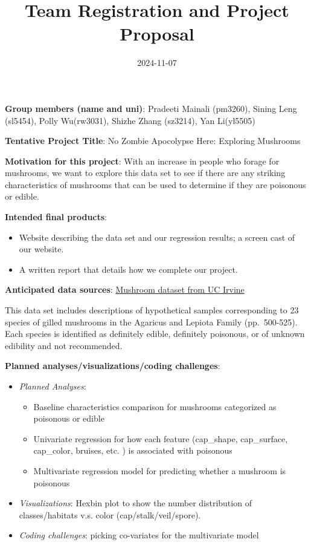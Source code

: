 \documentclass[
]{article}
\title{Team Registration and Project Proposal}
\author{}
\date{\vspace{-2.5em}2024-11-07}
\providecommand{\tightlist}{%
  \setlength{\itemsep}{0pt}\setlength{\parskip}{0pt}}
\begin{document}
\maketitle

\textbf{Group members (name and uni)}: Pradeeti Mainali (pm3260), Sining
Leng (sl5454), Polly Wu(rw3031), Shizhe Zhang (sz3214), Yan Li(yl5505)

\textbf{Tentative Project Title}: No Zombie Apocolypse Here: Exploring
Mushrooms

\textbf{Motivation for this project}: With an increase in people who
forage for mushrooms, we want to explore this data set to see if there
are any striking characteristics of mushrooms that can be used to
determine if they are poisonous or edible.

\textbf{Intended final products}:

\begin{itemize}
\tightlist
\item
  Website describing the data set and our regression results; a screen
  cast of our website.
\item
  A written report that details how we complete our project.
\end{itemize}

\textbf{Anticipated data sources}:
\href{https://archive.ics.uci.edu/dataset/73/mushroom}{Mushroom dataset
from UC Irvine}

This data set includes descriptions of hypothetical samples
corresponding to 23 species of gilled mushrooms in the Agaricus and
Lepiota Family (pp.~500-525). Each species is identified as definitely
edible, definitely poisonous, or of unknown edibility and not
recommended.

\textbf{Planned analyses/visualizations/coding challenges}:

\begin{itemize}
\tightlist
\item
  \emph{Planned Analyses}:

  \begin{itemize}
  \tightlist
  \item
    Baseline characteristics comparison for mushrooms categorized as
    poisonous or edible
  \item
    Univariate regression for how each feature (cap\_shape,
    cap\_surface, cap\_color, bruises, etc. ) is associated with
    poisonous
  \item
    Multivariate regression model for predicting whether a mushroom is
    poisonous
  \end{itemize}
\item
  \emph{Visualizations}: Hexbin plot to show the number distribution of
  classes/habitats v.s. color (cap/stalk/veil/spore).
\item
  \emph{Coding challenges}: picking co-variates for the multivariate
  model
\end{itemize}
\end{document}
